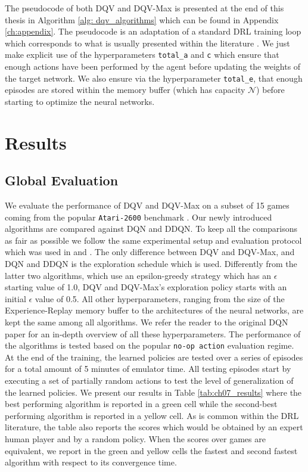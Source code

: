 The pseudocode of both DQV and DQV-Max is presented at the end of this thesis in Algorithm \ref{alg: dqv_algorithms} which can be found in Appendix \ref{ch:appendix}. The pseudocode is an adaptation of a standard DRL training loop which corresponds to what is usually presented within the literature \cite{mnih2015human}. We just make explicit use of the hyperparameters \texttt{total\_a} and \texttt{c} which ensure that enough actions have been performed by the agent before updating the weights of the target network. We also ensure via the hyperparameter \texttt{total\_e}, that enough episodes are stored within the memory buffer (which has capacity $\mathcal{N}$) before starting to optimize the neural networks. 



\section{Results}
\label{sec:ijcnn_results}

\subsection{Global Evaluation}
\label{sec:global_evaluation}

We evaluate the performance of DQV and DQV-Max on a subset of 15 games coming from the popular \texttt{Atari-2600} benchmark \cite{bellemare2013arcade}. Our newly introduced algorithms are compared against DQN and DDQN. To keep all the comparisons as fair as possible we follow the same experimental setup and evaluation protocol which was used in \cite{mnih2015human} and \cite{van2016deep}. The only difference between DQV and DQV-Max, and DQN and DDQN is the exploration schedule which is used. Differently from the latter two algorithms, which use an epsilon-greedy strategy which has an $\epsilon$ starting value of 1.0, DQV and DQV-Max's exploration policy starts with an initial $\epsilon$ value of 0.5. All other hyperparameters, ranging from the size of the Experience-Replay memory buffer to the architectures of the neural networks, are kept the same among all algorithms. We refer the reader to the original DQN paper \cite{mnih2015human} for an in-depth overview of all these hyperparameters. The performance of the algorithms is tested based on the popular \texttt{no-op action} evaluation regime. At the end of the training, the learned policies are tested over a series of episodes for a total amount of 5 minutes of emulator time. All testing episodes start by executing a set of partially random actions to test the level of generalization of the learned policies. We present our results in Table \ref{tab:ch07_results} where the best performing algorithm is reported in a green cell while the second-best performing algorithm is reported in a yellow cell. As is common within the DRL literature, the table also reports the scores which would be obtained by an expert human player and by a random policy. When the scores over games are equivalent, we report in the green and yellow cells the fastest and second fastest algorithm with respect to its convergence time. 

